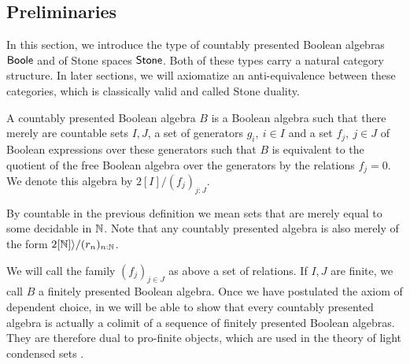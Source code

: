 \subsection{Preliminaries}

In this section, we introduce the type of countably presented Boolean algebras $\mathsf{Boole}$ and of Stone spaces $\mathsf{Stone}$. 
Both of these types carry a natural category structure. 
In later sections, we will axiomatize an anti-equivalence between these categories, 
which is classically valid and called Stone duality. 


\begin{definition}
  A countably presented Boolean algebra $B$ is a Boolean algebra such that there merely are 
  countable sets $I,J$, 
  a set of generators $g_i,~{i\in I}$ and a set $f_j,~{j\in J}$ of Boolean expressions over these generators 
  such that $B$ is equivalent to the quotient of the free Boolean algebra over the generators by the relations
  $f_j=0$. We denote this algebra by $2[I]/(f_j)_{j:J}$.
\end{definition} 
\begin{remark}
By countable in the previous definition we mean sets that are merely equal to some decidable in $\mathbb{N}$. 
Note that any countably presented algebra is also merely of the form $2[\mathbb{N}]\rangle / (r_n)_{n:\mathbb{N}}$.
\end{remark}


We will call the family $(f_j)_{j\in J}$ as above a set of relations. 
If $I,J$ are finite, we call $B$ a finitely presented Boolean algebra. 
Once we have postulated the axiom of dependent choice, 
in 
we will be able to show that every countably presented algebra 
is actually a colimit of a sequence of finitely presented Boolean algebras.
They are therefore dual to pro-finite objects, which are used 
in the theory of light condensed sets \cite{Scholze,Dagur,TODO}.

